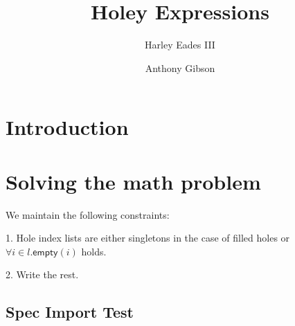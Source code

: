 \documentclass[12pt]{article}
\title{Holey Expressions}
\author{Harley Eades III \and Anthony Gibson}
\begin{document}
\maketitle

\begin{abstract}
  
\end{abstract}

\section{Introduction}
\label{sec:introduction}


\section{Solving the math problem}

We maintain the following constraints:

1. Hole index lists are either singletons in the case of filled holes or
$\forall i\in l. \mathsf{empty}(i)$ holds.

2. Write the rest.


\subsection{Spec Import Test}
\specall



\appendix
\end{document}
